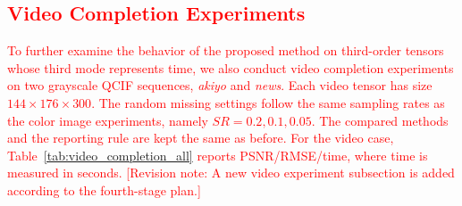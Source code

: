 \documentclass[a4paper,12pt]{article}
\numberwithin{equation}{section}
\numberwithin{algorithm}{section}
\newcommand{\rev}[1]{\textcolor{red}{#1}}
\newcommand{\revnote}[1]{\textcolor{red}{[Revision note: #1]}}
\theoremstyle{remark}
\theoremstyle{definition}
\begin{document}
\subsection{\texorpdfstring{\textcolor{red}{Video Completion Experiments}}{Video Completion Experiments}}
\rev{To further examine the behavior of the proposed method on third-order tensors whose third mode represents time, we also conduct video completion experiments on two grayscale QCIF sequences, \textit{akiyo} and \textit{news}. Each video tensor has size $144\times176\times300$. The random missing settings follow the same sampling rates as the color image experiments, namely $SR=0.2,0.1,0.05$. The compared methods and the reporting rule are kept the same as before. For the video case, Table~\ref{tab:video_completion_all} reports PSNR/RMSE/time, where time is measured in seconds.} \revnote{A new video experiment subsection is added according to the fourth-stage plan.}
\end{document}
